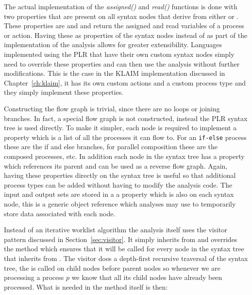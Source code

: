   The actual implementation of the \textit{assigned()} and \textit{read()} 
  functions is done with two properties that are present on all syntax nodes
  that derive from either  or . These properties
  are  and  and return the
  assigned and read variables of a process or action. Having these as 
  properties of the syntax nodes instead of as part of the implementation of 
  the analysis allows for greater extensibility. Languages implemented using 
  the PLR that have their own custom syntax nodes simply need to override 
  these properties and can then use the analysis without further 
  modifications. This is the case in the KLAIM implementation discussed in 
  Chapter~\ref{ch:klaim}, it has its own custom actions and a custom process 
  type and they simply implement these properties.
  
  Constructing the flow graph is trivial, since there are no loops or joining
  branches. In fact, a special flow graph is not constructed, instead the PLR
  syntax tree is used directly. To make it simpler, each  node
  is required to implement a  property which is a list of all
  the processes it can flow to. For an \texttt{if-else} process these are the 
  if and else branches, for parallel composition these are the composed 
  processes, etc. In addition each node in the syntax tree has a 
   property which references its parent and can be used as a 
  reverse flow graph. Again, having these properties directly on the syntax 
  tree is useful so that additional process types can be added without having 
  to modify the analysis code. The input and output sets are stored in a a 
   property which is also on each syntax node, this is a generic 
  object reference which analyses may use to temporarily store data associated 
  with each node.
  
  Instead of an iterative worklist algorithm the analysis itself uses the
  visitor pattern discussed in Section~\ref{sec:visitor}. It simply inherits
  from  and overrides the  
  method which ensures that it will be called for every node in the syntax 
  tree that inherits from . The visitor does a depth-first 
  recursive traversal of  the syntax tree, the  is called on 
  child nodes before parent nodes so whenever we are processing a process $p$ 
  we know that all its child nodes have already been processed. What is needed
  in the method itself is then:
  
